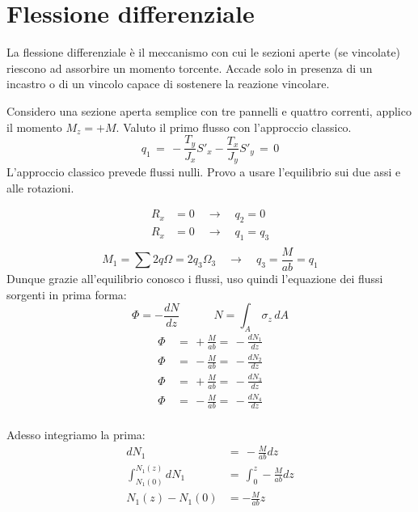 \section{Flessione differenziale}

La flessione differenziale è il meccanismo con cui le sezioni aperte (se vincolate) riescono ad assorbire un momento torcente. Accade solo in presenza di un incastro o di un vincolo capace di sostenere la reazione vincolare.

Considero una sezione aperta semplice con tre pannelli e quattro correnti, applico il momento $M_z = +M$. Valuto il primo flusso con l'approccio classico.
\begin{equation*}
    q_1 \,=\, -\frac{T_y}{J_x}S'_x-\frac{T_x}{J_y}S'_y \,=\,0
\end{equation*}
L'approccio classico prevede flussi nulli. Provo a usare l'equilibrio sui due assi e alle rotazioni.

\begin{align*}
    R_x &=0 \quad\rightarrow\quad q_2=0\\
    R_x &=0 \quad\rightarrow\quad q_1=q_3\\
\end{align*}
\begin{equation*}
    M_1 = \sum2q\Omega = 2q_3\Omega_3\quad\rightarrow\quad q_3=\frac{M}{ab}=q_1
\end{equation*}
Dunque grazie all'equilibrio conosco i flussi, uso quindi l'equazione dei flussi sorgenti in prima forma:
\begin{equation*}
    \Phi = -\frac{dN}{dz}\quad\quad\quad N= \int_A\,\sigma_z\,dA
\end{equation*}
\begin{align*}
    \Phi \,&=\, +\frac{M}{ab}=\,-\frac{dN_1}{dz}\\
    \Phi \,&=\, -\frac{M}{ab}=\,-\frac{dN_2}{dz}\\
    \Phi \,&=\, +\frac{M}{ab}=\,-\frac{dN_3}{dz}\\
    \Phi \,&=\, -\frac{M}{ab}=\,-\frac{dN_4}{dz}\\
\end{align*}

Adesso integriamo la prima:
\begin{align*}
     dN_1\,&=\,-\frac{M}{ab}dz\\
    \int_{N_1(0)}^{N_1(z)}  dN_1\,&=\,\int_0^z-\frac{M}{ab}dz\\
    N_1(z) - N_1(0)  &=-\frac{M}{ab}z
\end{align*}

